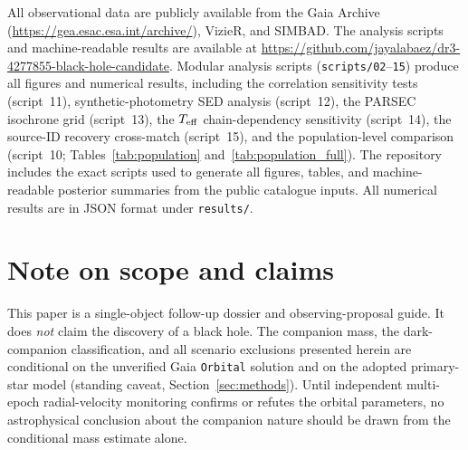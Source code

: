 \documentclass[usenatbib,fleqn]{mnras}
\begin{document}
All observational data are publicly available from the Gaia Archive
(\url{https://gea.esac.esa.int/archive/}), VizieR, and SIMBAD.
The analysis scripts and machine-readable results are available at
\url{https://github.com/jayalabaez/dr3-4277855-black-hole-candidate}.
Modular analysis scripts (\texttt{scripts/02}--\texttt{15}) produce
all figures and numerical results, including the correlation
sensitivity tests (script~11), synthetic-photometry SED analysis
(script~12), the PARSEC isochrone grid (script~13),
the $T_{\rm eff}$ chain-dependency sensitivity (script~14),
the source-ID recovery cross-match (script~15),
and the population-level
comparison (script~10; Tables~\ref{tab:population}
and~\ref{tab:population_full}).  The repository includes the
exact scripts used to generate all figures, tables, and
machine-readable posterior summaries from the public catalogue
inputs.  All numerical results are in
JSON format under \texttt{results/}.




\appendix
\section{Note on scope and claims}
\label{app:scope}

This paper is a single-object follow-up dossier and
observing-proposal guide.  It does \emph{not} claim the discovery
of a black hole.  The companion mass, the dark-companion
classification, and all scenario exclusions presented herein are
conditional on the unverified Gaia \texttt{Orbital} solution and
on the adopted primary-star model (standing caveat,
Section~\ref{sec:methods}).  Until independent multi-epoch
radial-velocity monitoring confirms or refutes the orbital
parameters, no astrophysical conclusion about the companion nature
should be drawn from the conditional mass estimate alone.

\end{document}
